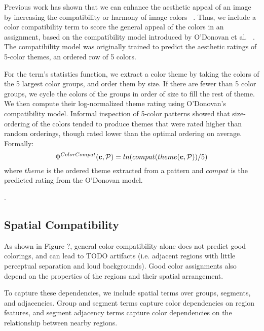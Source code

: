 Previous work has shown that we can enhance the aesthetic appeal of an image by increasing the compatibility or harmony of image colors ~\cite{CohenOrHarmonization,DressUp,ColorizationUsingHarmony,ODonovan}. Thus, we include a color compatibility term to score the general appeal of the colors in an assignment, based on the compatibility model introduced by O'Donovan et al. ~\cite{ODonovan}. The compatibility model was originally trained to predict the aesthetic ratings of 5-color themes, an ordered row of 5 colors. 

For the term's statistics function, we extract a color theme by taking the colors of the 5 largest color groups, and order them by size. If there are fewer than 5 color groups, we cycle the colors of the groups in order of size to fill the rest of theme. We then compute their log-normalized theme rating using O'Donovan's compatibility model. Informal inspection of 5-color patterns showed that size-ordering of the colors tended to produce themes that were rated higher than random orderings, though rated lower than the optimal ordering on average. Formally:
\begin{equation*}
\Phi^{ColorCompat}(\mathbf{c}, \mathcal{P}) = ln(compat(theme(\mathbf{c}, \mathcal{P}))/5)
\end{equation*}
where $theme$ is the ordered theme extracted from a pattern and $compat$ is the predicted rating from the O'Donovan model.

.


\subsection{Spatial Compatibility}
\label{sec:spatialCompat}

As shown in Figure ?, general color compatibility alone does not predict good colorings, and can lead to TODO artifacts (i.e. adjacent regions with little perceptual separation and loud backgrounds). Good color assignments also depend on the properties of the regions and their spatial arrangement. 

To capture these dependencies, we include spatial terms over groups, segments, and adjacencies. Group and segment terms capture color dependencies on region features, and segment adjacency terms capture color dependencies on the relationship between nearby regions.

